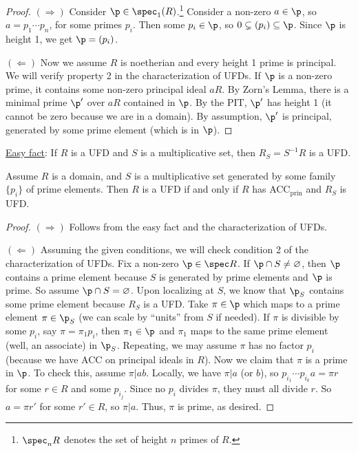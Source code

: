  \begin{proof}
   $(\Rightarrow)$ Consider $\p\in \spec_1(R)$.\footnote{$\spec_n R$ denotes the set of
   height $n$ primes of $R$.} Consider a non-zero $a\in \p$, so $a=p_1\cdots p_n$, for
   some primes $p_i$. Then some $p_i\in \p$, so $0\subsetneq(p_i)\subseteq \p$. Since
   $\p$ is height 1, we get $\p=(p_i)$.

   $(\Leftarrow)$ Now we assume $R$ is noetherian and every height 1 prime is principal.
   We will verify property 2 in the characterization of UFDs. If $\p$ is a non-zero
   prime, it contains some non-zero principal ideal $aR$. By Zorn's Lemma, there is a
   minimal prime $\p'$ over $aR$ contained in $\p$. By the PIT, $\p'$ has height 1 (it
   cannot be zero because we are in a domain). By assumption, $\p'$ is principal,
   generated by some prime element (which is in $\p$).
 \end{proof}
 \noindent\underline{Easy fact}: If $R$ is a UFD and $S$ is a multiplicative set, then
 $R_S=S^{-1}R$ is a UFD.
 \begin{theorem}[Nagata]
   Assume $R$ is a domain, and $S$ is a multiplicative set generated by some family
   $\{p_i\}$ of prime elements. Then $R$ is a UFD if and only if $R$ has
   ACC$_\text{prin}$ and $R_S$ is UFD.
 \end{theorem}
 \begin{proof}
   $(\Rightarrow)$ Follows from the easy fact and the characterization of UFDs.

   $(\Leftarrow)$ Assuming the given conditions, we will check condition 2 of the
   characterization of UFDs. Fix a non-zero $\p\in \spec R$. If $\p\cap
   S\neq\varnothing$, then $\p$ contains a prime element because $S$ is generated by
   prime elements and $\p$ is prime. So assume $\p\cap S=\varnothing$. Upon localizing at
   $S$, we know that $\p_S$ contains some prime element because $R_S$ is a UFD. Take
   $\pi\in \p$ which maps to a prime element $\pi\in \p_S$ (we can scale by ``units''
   from $S$ if needed). If $\pi$ is divisible by some $p_i$, say $\pi=\pi_1 p_i$, then
   $\pi_1\in \p$ and $\pi_1$ maps to the same prime element (well, an associate) in
   $\p_S$. Repeating, we may assume $\pi$ has no factor $p_i$ (because we have ACC on
   principal ideals in $R$). Now we claim that $\pi$ is a prime in $\p$. To check this,
   assume $\pi|ab$. Locally, we have $\pi|a$ (or $b$), so $p_{i_1}\cdots p_{i_k}a = \pi
   r$ for some $r\in R$ and some $p_{i_j}$. Since no $p_i$ divides $\pi$, they must all
   divide $r$. So $a=\pi r'$ for some $r'\in R$, so $\pi|a$. Thus, $\pi$ is prime, as
   desired.
 \end{proof}
